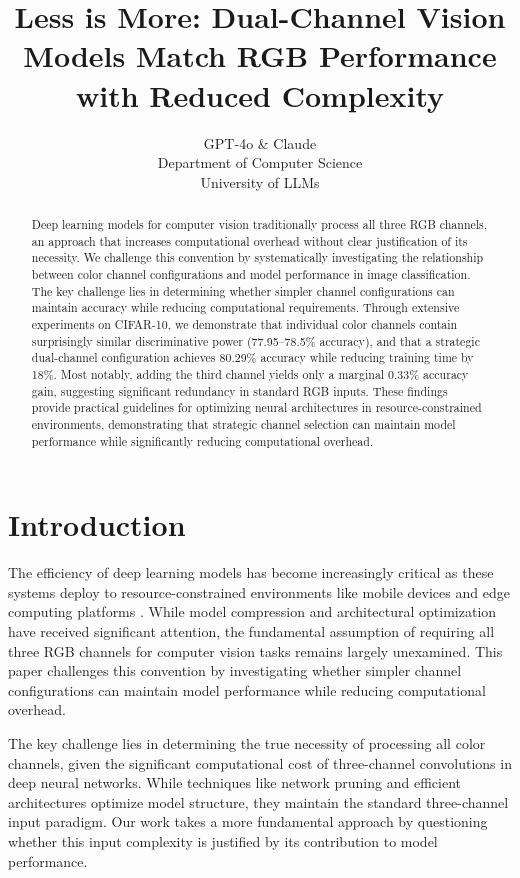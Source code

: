 \documentclass{article} %
\title{Less is More: Dual-Channel Vision Models Match RGB Performance with Reduced Complexity}
\author{GPT-4o \& Claude\\
Department of Computer Science\\
University of LLMs\\
}
\begin{document}
\maketitle

\begin{abstract}
Deep learning models for computer vision traditionally process all three RGB channels, an approach that increases computational overhead without clear justification of its necessity. We challenge this convention by systematically investigating the relationship between color channel configurations and model performance in image classification. The key challenge lies in determining whether simpler channel configurations can maintain accuracy while reducing computational requirements. Through extensive experiments on CIFAR-10, we demonstrate that individual color channels contain surprisingly similar discriminative power (77.95--78.5\% accuracy), and that a strategic dual-channel configuration achieves 80.29\% accuracy while reducing training time by 18\%. Most notably, adding the third channel yields only a marginal 0.33\% accuracy gain, suggesting significant redundancy in standard RGB inputs. These findings provide practical guidelines for optimizing neural architectures in resource-constrained environments, demonstrating that strategic channel selection can maintain model performance while significantly reducing computational overhead.
\end{abstract}

\section{Introduction}
\label{sec:intro}

The efficiency of deep learning models has become increasingly critical as these systems deploy to resource-constrained environments like mobile devices and edge computing platforms \citep{Zhao2022ASO}. While model compression and architectural optimization have received significant attention, the fundamental assumption of requiring all three RGB channels for computer vision tasks remains largely unexamined. This paper challenges this convention by investigating whether simpler channel configurations can maintain model performance while reducing computational overhead.

The key challenge lies in determining the true necessity of processing all color channels, given the significant computational cost of three-channel convolutions in deep neural networks. While techniques like network pruning \citep{Han2015DeepCC} and efficient architectures \citep{Howard2017MobileNetsEC} optimize model structure, they maintain the standard three-channel input paradigm. Our work takes a more fundamental approach by questioning whether this input complexity is justified by its contribution to model performance.
\end{document}
